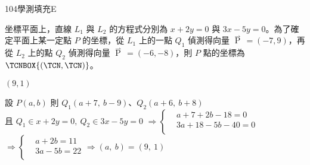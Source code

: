 \begin{QUESTIONS}
\begin{QUESTION}
\begin{QSOLLIST}
        \end{QSOLLIST}
        \begin{QEMPTYSPACE}
        \end{QEMPTYSPACE}
    \end{QUESTION}
    \begin{QUESTION}
        \begin{ExamInfo}{104}{學測}{填充}{E}
        \end{ExamInfo}
        \begin{ExamAnsRateInfo}{31}{71}{21}{1}
        \end{ExamAnsRateInfo}
        \begin{QBODY}
            坐標平面上，直線 ${{L}_{1}}$ 與 ${{L}_{2}}$ 的方程式分別為 $x+2y=0$ 與 $3x-5y=0$。為了確定平面上某一定點 $P$ 的坐標，從 ${{L}_{1}}$ 上的一點 ${{Q}_{1}}$ 偵測得向量 $\overset{\rightharpoonup }{\mathop{{{Q}_{1}}P}}\,=\left( -7,9 \right)$，再從 ${{L}_{2}}$ 上的點 ${{Q}_{2}}$ 偵測得向量 $\overset{\rightharpoonup }{\mathop{{{Q}_{2}}P}}\,=\left( -6,-8 \right)$，則 $P$ 點的坐標為 $\TCNBOX{\left( \TCN, \TCN \right)}$。
        \end{QBODY}
        \begin{QFROMS}
        \end{QFROMS}
        \begin{QTAGS}\end{QTAGS}
        \begin{QANS}
            $(9,1)$
        \end{QANS}
        \begin{QSOLLIST}
            \begin{QSOL}
				設 $P\left( a,b \right)$ 則 ${{Q}_{1}}\left( a+7,\ b-9 \right)$、${{Q}_{2}}\left( a+6,\ b+8 \right)$\\
				且 ${{Q}_{1}}\in x+2y=0,\ {{Q}_{2}}\in 3x-5y=0$
				$\Rightarrow \left\{ \begin{aligned}
				  & a+7+2b-18=0 \\ 
				 & 3a+18-5b-40=0 \\ 
				\end{aligned} \right.$$\Rightarrow \left\{ \begin{aligned}
				  & a+2b=11 \\ 
				 & 3a-5b=22 \\ 
				\end{aligned} \right.\Rightarrow \left( a,\ b \right)=\left( 9,\ 1 \right)$

			\end{QSOL}
        

\end{QSOLLIST}
\end{QUESTION}
\end{QUESTIONS}
